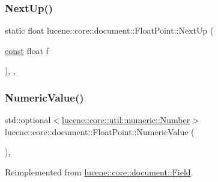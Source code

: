 \subsubsection{\texorpdfstring{Next\+Up()}{NextUp()}}
{\footnotesize\ttfamily static float lucene\+::core\+::document\+::\+Float\+Point\+::\+Next\+Up (\begin{DoxyParamCaption}\item[{\mbox{\hyperlink{ZlibCrc32_8h_a2c212835823e3c54a8ab6d95c652660e}{const}} float}]{f }\end{DoxyParamCaption})\hspace{0.3cm}{\ttfamily [inline]}, {\ttfamily [static]}, {\ttfamily [noexcept]}}

\mbox{\label{classlucene_1_1core_1_1document_1_1FloatPoint_ac2f070785fcce64c8214bb851fb6087c}} 
\subsubsection{\texorpdfstring{Numeric\+Value()}{NumericValue()}}
{\footnotesize\ttfamily std\+::optional$<$\mbox{\hyperlink{classlucene_1_1core_1_1util_1_1numeric_1_1Number}{lucene\+::core\+::util\+::numeric\+::\+Number}}$>$ lucene\+::core\+::document\+::\+Float\+Point\+::\+Numeric\+Value (\begin{DoxyParamCaption}{ }\end{DoxyParamCaption})\hspace{0.3cm}{\ttfamily [inline]}, {\ttfamily [virtual]}}



Reimplemented from \mbox{\hyperlink{classlucene_1_1core_1_1document_1_1Field_a858814043215c98bacf6ecc823d078ea}{lucene\+::core\+::document\+::\+Field}}.

\mbox{\label{classlucene_1_1core_1_1document_1_1FloatPoint_ad3370170ead68941120b8f8c7af1aaa2}} 
